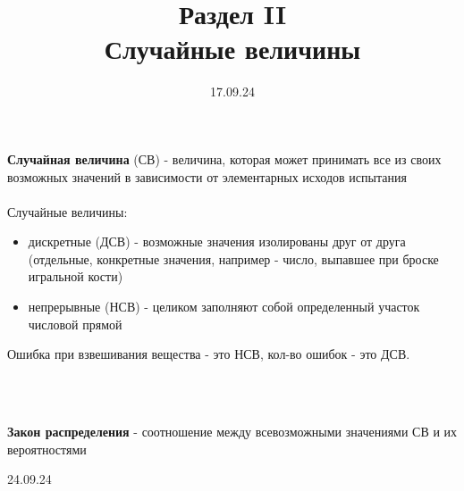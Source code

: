 

\title{Раздел II \\
       Случайные величины}
\date{17.09.24}


    \maketitle
    \begin{opr}
        \textbf{Случайная величина} (СВ) - величина, которая может принимать
        все из своих возможных значений в зависимости от элементарных
        исходов испытания
        \\
        \\
        Случайные величины: 
        \begin{itemize}
            \item дискретные (ДСВ) - возможные значения изолированы друг от друга 
                  (отдельные, конкретные значения, например - число, выпавшее при 
                  броске игральной кости)
            \item непрерывные (НСВ) - целиком заполняют собой определенный участок 
                  числовой прямой
        \end{itemize}
        \begin{ex}
            Ошибка при взвешивания вещества - это НСВ, кол-во ошибок - это ДСВ. 
        \end{ex}
    \end{opr}

    \\
    \\
    \begin{opr}
        \textbf{Закон распределения} - соотношение между
        всевозможными значениями СВ и их вероятностями
    \end{opr}



    \vspace{2cm}
    \centering\large{24.09.24}
    
